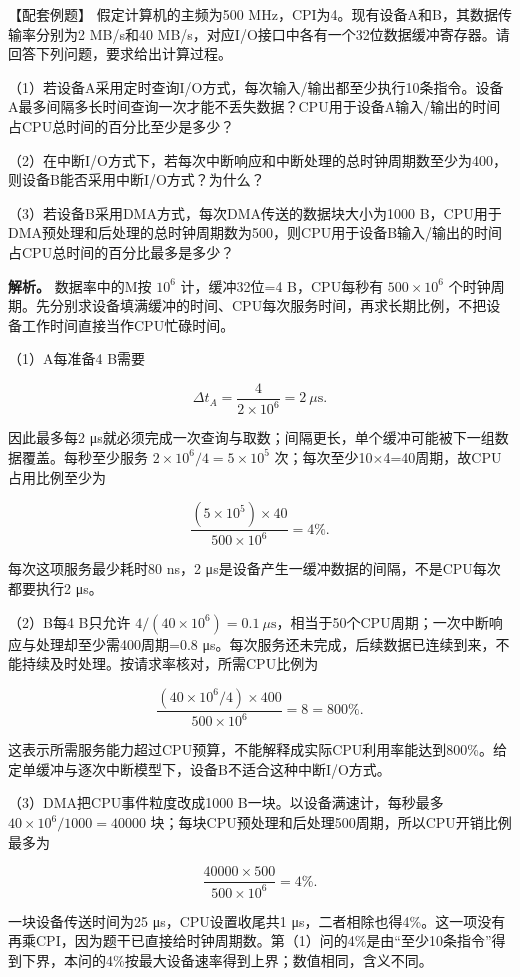 【配套例题】 假定计算机的主频为500 MHz，CPI为4。现有设备A和B，其数据传输率分别为2 MB/s和40 MB/s，对应I/O接口中各有一个32位数据缓冲寄存器。请回答下列问题，要求给出计算过程。

（1）若设备A采用定时查询I/O方式，每次输入/输出都至少执行10条指令。设备A最多间隔多长时间查询一次才能不丢失数据？CPU用于设备A输入/输出的时间占CPU总时间的百分比至少是多少？

（2）在中断I/O方式下，若每次中断响应和中断处理的总时钟周期数至少为400，则设备B能否采用中断I/O方式？为什么？

（3）若设备B采用DMA方式，每次DMA传送的数据块大小为1000 B，CPU用于DMA预处理和后处理的总时钟周期数为500，则CPU用于设备B输入/输出的时间占CPU总时间的百分比最多是多少？

\textbf{解析。} 数据率中的M按 \(10^6\) 计，缓冲32位=4 B，CPU每秒有 \(500\times10^6\) 个时钟周期。先分别求设备填满缓冲的时间、CPU每次服务时间，再求长期比例，不把设备工作时间直接当作CPU忙碌时间。

（1）A每准备4 B需要

\[
\Delta t_A=\frac4{2\times10^6}=2\ \mu\mathrm s.
\]

因此最多每2 μs就必须完成一次查询与取数；间隔更长，单个缓冲可能被下一组数据覆盖。每秒至少服务 \(2\times10^6/4=5\times10^5\) 次；每次至少10\ensuremath{\times}4=40周期，故CPU占用比例至少为

\[
\frac{(5\times10^5)\times40}{500\times10^6}=4\%.
\]

每次这项服务最少耗时80 ns，2 μs是设备产生一缓冲数据的间隔，不是CPU每次都要执行2 μs。

（2）B每4 B只允许 \(4/(40\times10^6)=0.1\ \mu\mathrm s\)，相当于50个CPU周期；一次中断响应与处理却至少需400周期=0.8 μs。每次服务还未完成，后续数据已连续到来，不能持续及时处理。按请求率核对，所需CPU比例为

\[
\frac{(40\times10^6/4)\times400}{500\times10^6}=8=800\%.
\]

这表示所需服务能力超过CPU预算，不能解释成实际CPU利用率能达到800\%。给定单缓冲与逐次中断模型下，设备B不适合这种中断I/O方式。

（3）DMA把CPU事件粒度改成1000 B一块。以设备满速计，每秒最多 \(40\times10^6/1000=40000\) 块；每块CPU预处理和后处理500周期，所以CPU开销比例最多为

\[
\frac{40000\times500}{500\times10^6}=4\%.
\]

一块设备传送时间为25 μs，CPU设置收尾共1 μs，二者相除也得4\%。这一项没有再乘CPI，因为题干已直接给时钟周期数。第（1）问的4\%是由``至少10条指令''得到下界，本问的4\%按最大设备速率得到上界；数值相同，含义不同。

